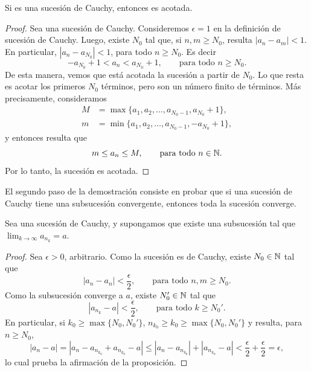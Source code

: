 \begin{proposition}\label{P:Cauchy=>Acotada}
    Si \sucan es una sucesión de Cauchy, entonces es acotada.
\end{proposition}

\begin{proof}
    Sea \sucan una sucesión de Cauchy. Consideremos $\epsilon = 1$ en la definición de sucesión de Cauchy. Luego, existe $N_0$ tal que, si $n,m\ge N_0$, resulta $|a_n-a_m|<1.$
    En particular, $|a_n - a_{N_0}| < 1$, para todo $n\ge N_0$. Es decir
    \[
    -a_{N_0} + 1 < a_n < a_{N_0} + 1, \qquad \text{para todo $n\ge N_0$}. 
    \]
    De esta manera, vemos que está acotada la sucesión a partir de $N_0$. Lo que resta es acotar los primeros $N_0$ términos, pero son un número finito de términos.
    Más precisamente, consideramos
    \begin{align*}
        M &= \max\{a_1, a_2, \dots, a_{N_0-1}, a_{N_0}+1\}, 
        \\
        m &= \min\{a_1, a_2, \dots, a_{N_0-1}, -a_{N_0}+1\}, 
    \end{align*}
    y entonces resulta que
    \[
    m \le a_n \le M, \qquad \text{para todo {\ensuremath{n\in\mathbb{N}}}}.
    \]
    Por lo tanto, la sucesión es acotada.
\end{proof}

El segundo paso de la demostración consiste en probar que si una sucesión de Cauchy tiene una subsucesión convergente, entonces toda la sucesión converge.

\begin{proposition}\label{P:Cauchy+subsuc=>convergencia}
    Sea \sucan una sucesión de Cauchy, y supongamos que existe una subsucesión \subsucan tal que $\lim_{k\to\infty} a_{n_k} = a$.
\end{proposition}

\begin{proof}
    Sea $\epsilon>0$, arbitrario. Como la sucesión \sucan es de Cauchy, existe $N_0\in\mathbb{N}$ tal que
    \[
    |a_n - a_n | < \frac\epsilon2,\qquad\text{para todo $n,m\ge N_0$}.
    \]
    Como la subsucesión \subsucan converge a $a$, existe $N_0'\in\mathbb{N}$ tal que 
    \[
    | a_{n_k} - a | < \frac\epsilon2,\qquad\text{para todo $k \ge N_0'$}.
    \]
    En particular, si $k_0 \ge \max\{N_0,N_0'\}$, $n_{k_0} \ge k_0 \ge \max\{N_0,N_0'\}$ y resulta, para $n\ge N_0$,
    \[
    |a_n - a| = |a_n - a_{n_{k_0}} + a_{n_{k_0}} - a|
    \le |a_n - a_{n_{k_0}}| + |a_{n_{k_0}} - a|
    < \frac\epsilon2 + \frac\epsilon2 = \epsilon,
    \]
    lo cual prueba la afirmación de la proposición.
\end{proof}

